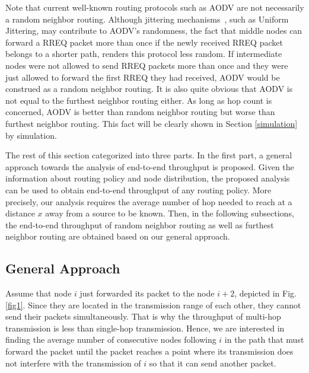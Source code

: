 \documentclass[12pt, draftclsnofoot, onecolumn]{IEEEtran}
\begin{document}
Note that current well-known routing protocols such as AODV are not 
necessarily a random neighbor routing. Although jittering mechanisms~\cite{rezaei2016impact,rezaei2017general}, such as Uniform Jittering, 
may contribute to AODV's randomness, the fact that middle nodes can forward 
a RREQ packet more than once if the newly received RREQ packet belongs to 
a shorter path, renders this protocol less random. If intermediate nodes 
were not allowed to send RREQ packets more than once and they were just 
allowed to forward the first RREQ they had received, AODV would be 
construed as a random neighbor routing. 
It is also quite obvious that AODV is not equal to the furthest neighbor routing either. 
As long as hop count is concerned, AODV is better than random neighbor routing but worse than furthest neighbor routing. This fact will be clearly shown in Section \ref{simulation} by simulation.

The rest of this section categorized into three parts. In the 
first part, a general approach towards the analysis 
of end-to-end throughput is proposed. Given the information about routing policy and node distribution, the proposed analysis can be used to obtain end-to-end throughput of any routing policy. More precisely, our analysis requires the average number of hop needed to reach at a distance $x$ away from a source to be known.
Then, in the following subsections, the end-to-end throughput of random 
neighbor routing as well as furthest neighbor routing are obtained 
based on our general approach.

\subsection{General Approach}

Assume that node $i$ just forwarded its packet to the node $i+2$, 
depicted in  Fig. \ref{fig1}. Since they are 
located in the transmission range of each other, they cannot send their packets simultaneously. 
That is why the throughput of multi-hop transmission is less than 
single-hop transmission. 
Hence, we are interested in finding the average number 
of consecutive nodes following $i$ in the path that must forward the 
packet until the packet reaches a point where its transmission does not 
interfere with the transmission of $i$ so that it can send another packet.
\end{document}
